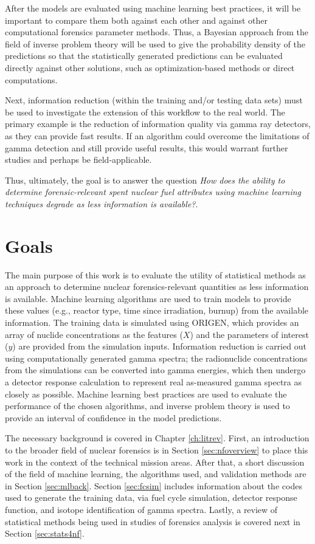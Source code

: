 After the models are evaluated using machine learning best practices, it will
be important to compare them both against each other and against other
computational forensics parameter methods. Thus, a Bayesian approach from the
field of inverse problem theory will be used to give the probability density of
the predictions so that the statistically generated predictions can be
evaluated directly against other solutions, such as optimization-based methods
or direct computations. 

Next, information reduction (within the training and/or testing data sets) must
be used to investigate the extension of this workflow to the real world. The
primary example is the reduction of information quality via gamma ray
detectors, as they can provide fast results.  If an algorithm could overcome
the limitations of gamma detection and still provide useful results, this would
warrant further studies and perhaps be field-applicable.

Thus, ultimately, the goal is to answer the question \textit{How
does the ability to determine forensic-relevant spent nuclear fuel attributes
using machine learning techniques degrade as less information is available?}. 

\section{Goals}

The main purpose of this work is to evaluate the utility of statistical methods
as an approach to determine nuclear forensics-relevant quantities as less
information is available. Machine learning algorithms are used to train models
to provide these values (e.g., reactor type, time since irradiation, burnup)
from the available information. The training data is simulated using
\gls{ORIGEN}, which provides an array of nuclide concentrations as the features
($X$) and the parameters of interest ($y$) are provided from the simulation
inputs.  Information reduction is carried out using computationally generated
gamma spectra; the radionuclide concentrations from the simulations can be
converted into gamma energies, which then undergo a detector response
calculation to represent real as-measured gamma spectra as closely as possible.
Machine learning best practices are used to evaluate the performance of the
chosen algorithms, and inverse problem theory is used to provide an interval of
confidence in the model predictions.

The necessary background is covered in Chapter \ref{ch:litrev}.  First, an
introduction to the broader field of nuclear forensics is in Section
\ref{sec:nfoverview} to place this work in the context of the technical mission
areas. After that, a short discussion of the field of machine learning, the
algorithms used, and validation methods are in Section \ref{sec:mlback}.
Section \ref{sec:fcsim} includes information about the codes used to generate
the training data, via fuel cycle simulation, detector response function, and
isotope identification of gamma spectra.  Lastly, a review of statistical
methods being used in studies of forensics analysis is covered next in Section
\ref{sec:stats4nf}. 

